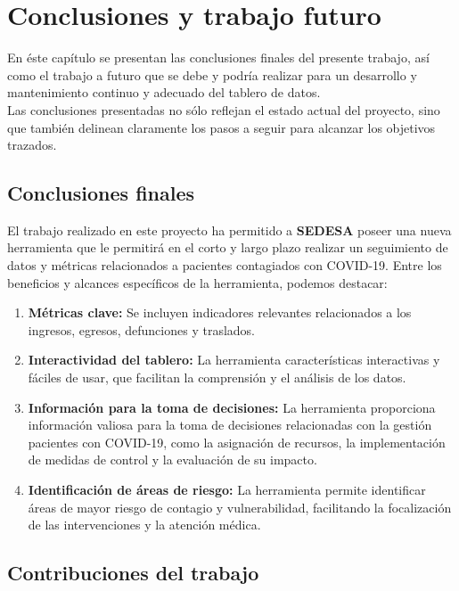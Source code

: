 \chapter{Conclusiones y trabajo futuro}\label{cap:conclusiones}


En éste capítulo se presentan las conclusiones finales del presente trabajo, así como el trabajo a futuro que se debe y podría realizar para un desarrollo y mantenimiento continuo y adecuado del tablero de datos.\\
Las conclusiones presentadas no sólo reflejan el estado actual del proyecto, sino que también delinean claramente los pasos a seguir para alcanzar los objetivos trazados.
\section{Conclusiones finales}

El trabajo realizado en este proyecto ha permitido a \textbf{SEDESA} poseer una nueva herramienta que le permitirá en el corto y largo plazo realizar un seguimiento de datos y métricas relacionados a pacientes contagiados con COVID-19. Entre los beneficios y alcances específicos de la herramienta, podemos destacar:

\begin{enumerate}
    \item  \textbf{Métricas clave:} Se incluyen indicadores relevantes relacionados a los ingresos, egresos, defunciones y traslados.

    \item  \textbf{Interactividad del tablero:} La herramienta características interactivas y fáciles de usar, que facilitan la comprensión y el análisis de los datos.

    \item \textbf{Información para la toma de decisiones:} La herramienta proporciona información valiosa para la toma de decisiones relacionadas con la gestión pacientes con COVID-19, como la asignación de recursos, la implementación de medidas de control y la evaluación de su impacto.

    \item \textbf{Identificación de áreas de riesgo:} La herramienta permite identificar áreas de mayor riesgo de contagio y vulnerabilidad, facilitando la focalización de las intervenciones y la atención médica.
\end{enumerate}

\section{Contribuciones del trabajo}

